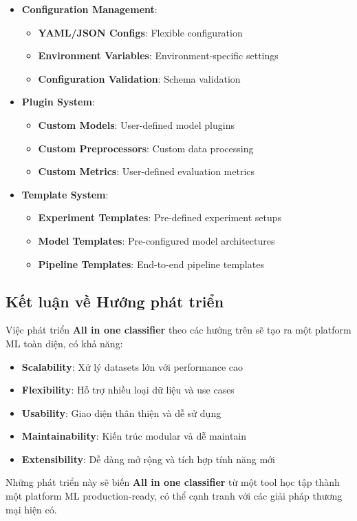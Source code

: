 \begin{itemize}
    \item \textbf{Configuration Management}:
    \begin{itemize}
        \item \textbf{YAML/JSON Configs}: Flexible configuration
        \item \textbf{Environment Variables}: Environment-specific settings
        \item \textbf{Configuration Validation}: Schema validation
    \end{itemize}
    
    \item \textbf{Plugin System}:
    \begin{itemize}
        \item \textbf{Custom Models}: User-defined model plugins
        \item \textbf{Custom Preprocessors}: Custom data processing
        \item \textbf{Custom Metrics}: User-defined evaluation metrics
    \end{itemize}
    
    \item \textbf{Template System}:
    \begin{itemize}
        \item \textbf{Experiment Templates}: Pre-defined experiment setups
        \item \textbf{Model Templates}: Pre-configured model architectures
        \item \textbf{Pipeline Templates}: End-to-end pipeline templates
    \end{itemize}
\end{itemize}

\subsection{Kết luận về Hướng phát triển}

Việc phát triển \textbf{All in one classifier} theo các hướng trên sẽ tạo ra một platform ML toàn diện, có khả năng:

\begin{itemize}
    \item \textbf{Scalability}: Xử lý datasets lớn với performance cao
    \item \textbf{Flexibility}: Hỗ trợ nhiều loại dữ liệu và use cases
    \item \textbf{Usability}: Giao diện thân thiện và dễ sử dụng
    \item \textbf{Maintainability}: Kiến trúc modular và dễ maintain
    \item \textbf{Extensibility}: Dễ dàng mở rộng và tích hợp tính năng mới
\end{itemize}

Những phát triển này sẽ biến \textbf{All in one classifier} từ một tool học tập thành một platform ML production-ready, có thể cạnh tranh với các giải pháp thương mại hiện có.
